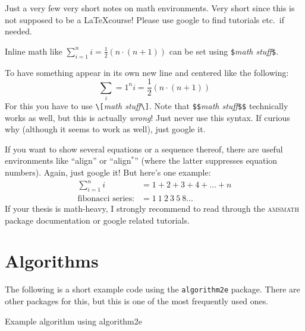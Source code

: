 Just a very few very short notes on math environments. Very short since this is not supposed to be a \LaTeX{course}! Please use google to find tutorials etc.\ if needed.

\begin{compactitem}
  \item Inline math like $\sum\limits_{i=1}^n i=\frac{1}{2}(n\cdot (n+1))$ can be set using \verb!$!\emph{math stuff}\verb!$!.
  \item To have something appear in its own new line and centered like the following:
  \[\sum\limits_i=1^n i=\frac{1}{2}(n\cdot (n+1))\]
  For this you have to use \verb!\[!\emph{math stuff}\verb!\]!. Note that \verb!$$!\emph{math stuff}\verb!$$! technically works as well, but this is actually \emph{wrong}! Just never use this syntax. If curious why (although it seems to work as well), just google it.
  \item If you want to show several equations or a sequence thereof, there are useful environments like ``align'' or ``align$^*$'' (where the latter suppresses equation numbers). Again, just google it! But here's one example:
  \begin{align}
    \sum\limits_{i=1}^n i &= 1+2+3+4+\dots+n\\
    \text{fibonacci series:}   &= 1\ 1\ 2\ 3\ 5\ 8 \dots
  \end{align}
  If your thesis is math-heavy, I strongly recommend to read through the \textsc{amsmath} package documentation or google related tutorials.
\end{compactitem}



\section{Algorithms}

The following is a short example code using the \verb!algorithm2e! package. There are other packages for this, but this is one of the most frequently used ones.

\begin{algorithm}[H]
  \DontPrintSemicolon  %
  \caption{Example algorithm using algorithm2e \label{alg:exampleAlg}}
\end{algorithm}

